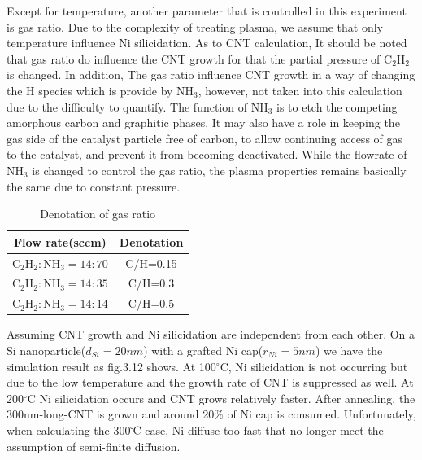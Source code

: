 Except for temperature, another parameter that is controlled in this experiment is gas ratio. Due to the complexity of treating plasma, we assume that only temperature influence Ni silicidation. As to CNT calculation, It should be noted that gas ratio do influence the CNT growth for that the partial pressure of $\mathrm{C_{2}H_{2}}$ is changed. In addition, The gas ratio influence CNT growth in a way of changing  the  H species which is provide by $\mathrm{NH_{3}}$, however, not taken into this calculation due to the difficulty to quantify. The function of $\mathrm{NH_{3}}$ is to etch the competing amorphous carbon and graphitic phases. It may also have a role in keeping the gas side of the catalyst particle free of carbon, to allow continuing access of gas to the catalyst, and prevent it from becoming deactivated. While the flowrate of $\mathrm{NH_{3}}$ is changed to control the gas ratio, the plasma properties remains basically the same due to constant pressure.
\begin{table}[H]
\centering
\caption{Denotation of gas ratio}
\begin{tabular}{cc}
\toprule
Flow rate(sccm) & Denotation \\ \midrule
$\mathrm{C_{2}H_{2}}:\mathrm{NH_{3}=14:70}$ & C/H=0.15     \\
$\mathrm{C_{2}H_{2}}:\mathrm{NH_{3}=14:35}$ & C/H=0.3     \\
$\mathrm{C_{2}H_{2}}:\mathrm{NH_{3}=14:14}$ & C/H=0.5     \\ \bottomrule
\end{tabular}
\end{table}
Assuming CNT growth and Ni silicidation are independent from each other. On a Si nanoparticle($d_{Si}=20 nm$) with a grafted Ni cap($r_{Ni}=5 nm$)  we have the simulation result as fig.3.12 shows. At 100\(^\circ\)C, Ni silicidation is not occurring but due to the low temperature and the growth rate of CNT is suppressed as well. At 200\(^\circ\)C Ni silicidation occurs and CNT grows relatively faster. After annealing, the 300nm-long-CNT is grown and around 20\% of Ni cap is consumed. Unfortunately, when calculating the 300℃ case, Ni diffuse too fast that no longer meet the assumption of semi-finite diffusion.  




